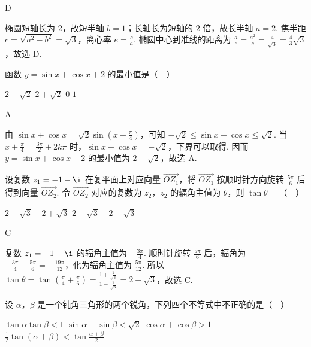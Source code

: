 \begin{answer}
D
\end{answer}

\begin{solution}
椭圆短轴长为 \(2\)，故短半轴 \(b=1\)；长轴长为短轴的 \(2\) 倍，故长半轴 \(a=2\). 焦半距 \(c=\sqrt{a^2-b^2}=\sqrt{3}\)，离心率 \(e=\frac ca\). 椭圆中心到准线的距离为 \(\frac ae=\frac{a^2}{c}=\frac4{\sqrt3}=\frac43\sqrt3\)，故选 D.
\end{solution}

\begin{problem}
函数 \(y=\sin x+\cos x+2\) 的最小值是（\(\quad\)）

\choices
    {\(2 - \sqrt{2}\)}
    {\(2 + \sqrt{2}\)}
    {\(0\)}
    {\(1\)}
\end{problem}

\begin{answer}
A
\end{answer}

\begin{solution}
由 \(\sin x+\cos x=\sqrt2\sin\left(x+\frac\pi4\right)\)，可知 \(-\sqrt2\leq\sin x+\cos x\leq\sqrt2\). 当 \(x+\frac\pi4=\frac{3\pi}{2}+2k\pi\) 时，\(\sin x+\cos x=-\sqrt2\)，下界可以取得. 因而 \(y=\sin x+\cos x+2\) 的最小值为 \(2-\sqrt2\)，故选 A.
\end{solution}

\begin{problem}
设复数 \(z_1=-1-\i\) 在复平面上对应向量 \(\overrightarrow{OZ_1}\)，将 \(\overrightarrow{OZ_1}\) 按顺时针方向旋转 \(\frac{5\pi}{6}\) 后得到向量 \(\overrightarrow{OZ_2}\). 令 \(\overrightarrow{OZ_2}\) 对应的复数为 \(z_2\)，\(z_2\) 的辐角主值为 \(\theta\)，则 \(\tan\theta=\)（\(\quad\)）

\choices
    {\(2 - \sqrt{3}\)}
    {\(-2+\sqrt{3}\)}
    {\(2 + \sqrt{3}\)}
    {\(-2-\sqrt{3}\)}
\end{problem}

\begin{answer}
C
\end{answer}

\begin{solution}
复数 \(z_1=-1-\i\) 的辐角主值为 \(-\frac{3\pi}{4}\). 顺时针旋转 \(\frac{5\pi}{6}\) 后，辐角为 \(-\frac{3\pi}{4}-\frac{5\pi}{6}=-\frac{19\pi}{12}\)，化为辐角主值为 \(\frac{5\pi}{12}\). 所以
\(\tan\theta=\tan\left(\frac\pi4+\frac\pi6\right)=\frac{1+\frac1{\sqrt3}}{1-\frac1{\sqrt3}}=2+\sqrt3\)，故选 C.
\end{solution}

\begin{problem}
设 \(\alpha\)，\(\beta\) 是一个钝角三角形的两个锐角，下列四个不等式中不正确的是（\(\quad\)）

\choices
    {\(\tan \alpha \tan \beta < 1\)}
    {\(\sin \alpha + \sin \beta < \sqrt{2}\)}
    {\(\cos \alpha + \cos \beta > 1\)}
    {\(\frac{1}{2}\tan\left(\alpha+\beta\right)<\tan\frac{\alpha+\beta}{2}\)}
\end{problem}

